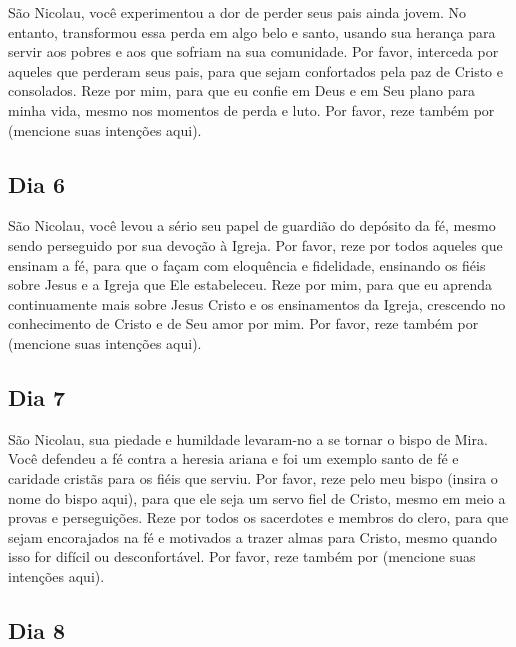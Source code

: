 \documentclass[11pt]{article}
\begin{document}
\textbf{}

São Nicolau, você experimentou a dor de perder seus pais ainda jovem. No entanto, transformou essa perda em algo belo e santo, usando sua herança para servir aos pobres e aos que sofriam na sua comunidade.  
Por favor, interceda por aqueles que perderam seus pais, para que sejam confortados pela paz de Cristo e consolados. Reze por mim, para que eu confie em Deus e em Seu plano para minha vida, mesmo nos momentos de perda e luto.  
Por favor, reze também por (mencione suas intenções aqui).  

\vfill
\subsection{Dia 6}

\textbf{}

São Nicolau, você levou a sério seu papel de guardião do depósito da fé, mesmo sendo perseguido por sua devoção à Igreja. Por favor, reze por todos aqueles que ensinam a fé, para que o façam com eloquência e fidelidade, ensinando os fiéis sobre Jesus e a Igreja que Ele estabeleceu.  
Reze por mim, para que eu aprenda continuamente mais sobre Jesus Cristo e os ensinamentos da Igreja, crescendo no conhecimento de Cristo e de Seu amor por mim.  
Por favor, reze também por (mencione suas intenções aqui).  

\subsection{Dia 7}

\textbf{}

São Nicolau, sua piedade e humildade levaram-no a se tornar o bispo de Mira. Você defendeu a fé contra a heresia ariana e foi um exemplo santo de fé e caridade cristãs para os fiéis que serviu. Por favor, reze pelo meu bispo (insira o nome do bispo aqui), para que ele seja um servo fiel de Cristo, mesmo em meio a provas e perseguições.  
Reze por todos os sacerdotes e membros do clero, para que sejam encorajados na fé e motivados a trazer almas para Cristo, mesmo quando isso for difícil ou desconfortável.  
Por favor, reze também por (mencione suas intenções aqui).  

\subsection{Dia 8}

\textbf{}
\end{document}
